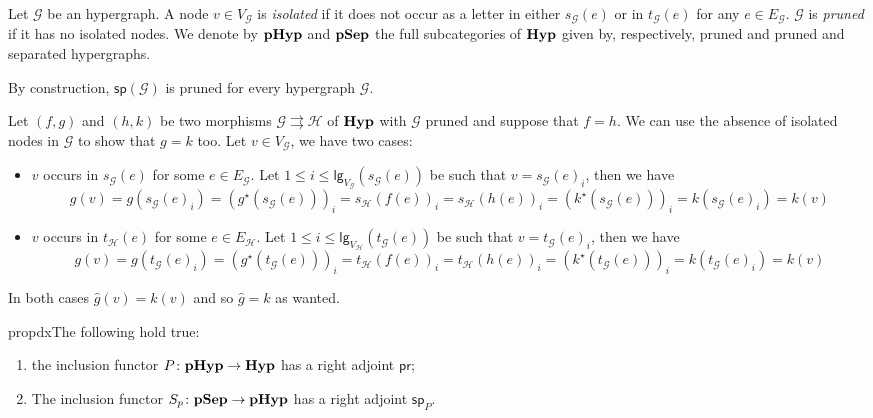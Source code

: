 \documentclass[3p]{elsarticle}
\newcommand{\lgh}{\mathsf{lg}}
\newcommand{\catname}[1]{\textbf{\textup{#1}}}
\newcommand{\hyp}{\catname{Hyp}}
\newcommand{\phyp}{\catname{pHyp}}
\newcommand{\pshyp}{\catname{pSep}}
\renewcommand{\sp}{\mathsf{sp}}
\newcommand{\pr}{\mathsf{pr}}
\theoremstyle{remark}
\theoremstyle{definition}
\begin{document}
\begin{defi} Let $\mathcal{G}$ be an hypergraph. A node $v\in V_{\mathcal{G}}$ is \emph{isolated} if it does not occur as a letter in either $s_{\mathcal{G}}(e)$ or in
$t_{\mathcal{G}}(e)$ for any $e\in E_{\mathcal{G}}$. $\mathcal{G}$ is \emph{pruned} if it has no isolated nodes. We denote by $\phyp$ and $\pshyp$ the full subcategories of $\hyp$ given by, respectively, pruned and pruned and separated hypergraphs.
\end{defi}


\begin{rem}\label{rem:prun}
	By construction, $\sp(\mathcal{G})$ is pruned for every hypergraph $\mathcal{G}$.
\end{rem}

\begin{rem}\label{rem:mprun}
	Let $(f,g)$ and $(h, k)$ be two morphisms $\mathcal{G}\rightrightarrows \mathcal{H}$ of $\hyp$ with $\mathcal{G}$ pruned and suppose that $f=h$. We can use the absence of isolated nodes in $\mathcal{G}$ to show that $g=k$ too. Let $v\in V_{\mathcal{G}}$, we have two cases:

	\begin{itemize}
		\item $v$ occurs in $s_{\mathcal{G}}(e)$ for some $e\in E_{\mathcal{G}}$. Let $1\leq i\leq \lgh_{V_{\mathcal{G}}}(s_{\mathcal{G}}(e))$ be such that $v=s_{\mathcal{G}}(e)_i$, then we have
		\[g(v)=g(s_{\mathcal{G}}(e)_i)=(g^\star(s_{\mathcal{G}}(e)))_i=s_{\mathcal{H}}(f(e))_i=s_{\mathcal{H}}(h(e))_i=(k^\star(s_{\mathcal{G}}(e)))_i=k(s_{\mathcal{G}}(e)_i)=k(v)\]
		\item $v$ occurs in $t_{\mathcal{H}}(e)$ for some $e\in E_{\mathcal{H}}$. Let $1\leq i\leq \lgh_{V_{\mathcal{H}}}(t_{\mathcal{G}}(e))$ be such that $v=t_{\mathcal{G}}(e)_i$, then we have
		\[g(v)=g(t_{\mathcal{G}}(e)_i)=(g^\star(t_{\mathcal{G}}(e)))_i=t_{\mathcal{H}}(f(e))_i=t_{\mathcal{H}}(h(e))_i=(k^\star(t_{\mathcal{G}}(e)))_i=k(t_{\mathcal{G}}(e)_i)=k(v)\]
	\end{itemize}
	In both cases $\hat{g}(v)=k(v)$ and so $\hat{g}= k$ as wanted.
\end{rem}

\begin{restatable}{prop}{dx}\label{prop:dx}The following hold true:
	\begin{enumerate}
		\item the inclusion functor $P\colon \phyp \to \hyp$ has a right adjoint $\pr$;
		\item The inclusion functor $S_p\colon \pshyp\to \phyp$ has a right adjoint $\sp_P$.
	\end{enumerate}
\end{restatable}
\end{document}
